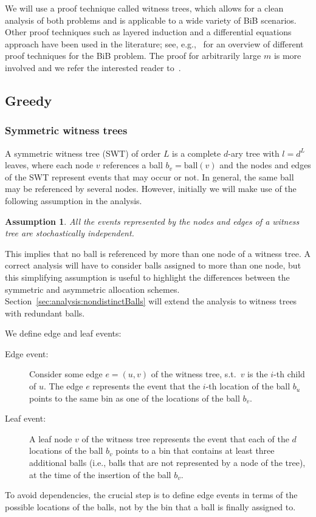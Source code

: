 \documentclass[a4paper,12pt]{article}
\newtheorem{assumption}{Assumption}
\begin{document}
We will use a proof technique called witness trees, which allows for a clean analysis of both problems and is applicable to a wide variety of BiB scenarios. Other proof techniques such as layered induction and a differential equations approach have been used in the literature; see, e.g.,~\cite{MRS01} for an overview of different proof techniques for the BiB problem. The proof for arbitrarily large $m$ is more involved and we refer the interested reader to~\cite{BCSV06, TW13}.

\subsection{Greedy}
\label{sec:analysis:greedy}

\subsubsection{Symmetric witness trees}
\label{sec:analysis:definitionSymWT}
A symmetric witness tree (SWT) of order $L$ is a complete $d$-ary tree with $l=d^{L}$ leaves, where each node $v$ references a ball $b_v = \mathrm{ball}(v)$ and the nodes and edges of the SWT represent events that may occur or not. In general, the same ball may be referenced by several nodes. However, initially we will make use of the following assumption in the analysis.
\begin{assumption}
\label{assumption:independence}
All the events represented by the nodes and edges of a witness tree are stochastically independent. 
\end{assumption} 
\noindent
This implies that no ball is referenced by more than one node of a witness tree. A correct analysis will have to consider balls assigned to more than one node, but this simplifying assumption is useful to highlight the differences between the symmetric and asymmetric allocation schemes. Section~\ref{sec:analysis:nondistinctBalls} will extend the analysis to witness trees with redundant balls.

We define edge and leaf events:
\begin{description}
\item [Edge event:] Consider some edge $e = (u,v)$ of the witness tree, s.t.~$v$ is the $i$-th child of $u$. The edge $e$ represents the event that the $i$-th location of the ball $b_u$ points to the same bin as one of the locations of the ball $b_v$. 
\item [Leaf event:] A leaf node $v$ of the witness tree represents the event that each of the $d$ locations of the ball $b_v$ points to a bin that contains at least three additional balls (i.e., balls that are not represented by a node of the tree), at the time of the insertion of the ball $b_v$.
\end{description}
To avoid dependencies, the crucial step is to define edge events in terms of the possible locations of the balls, not by the bin that a ball is finally assigned to. 
\end{document}
